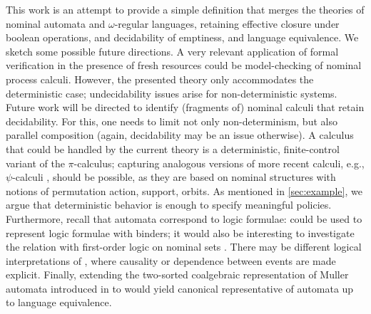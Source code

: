 This work is an attempt to provide a simple definition that merges the theories of nominal automata and $\omega$-regular languages, retaining effective closure under boolean operations, and decidability of emptiness, and language equivalence. We sketch some possible future directions. A very relevant application of formal verification in the presence of fresh resources could be model-checking of nominal process calculi. However, the presented theory only accommodates the deterministic case; undecidability issues arise for non-deterministic systems. Future work will be directed to identify (fragments of) nominal calculi that retain decidability. For this, one needs to limit not only non-determinism, but also parallel composition (again, decidability may be an issue otherwise). A calculus that could be handled by the current theory is a deterministic, finite-control variant of the $\pi$-calculus; capturing analogous versions of more recent calculi, e.g., $\psi$-calculi \cite{Bengtson11}, should be possible, as they are based on nominal structures with notions of permutation action, support, orbits. As mentioned in \autoref{sec:example}, we argue that deterministic behavior is enough to specify meaningful policies. 
%
Furthermore, recall that automata correspond to logic formulae: \hdmas{} could be used to represent logic formulae with binders; it would also be interesting to investigate the relation with first-order logic on nominal sets \cite{Bojanczyk13}. There may be different logical interpretations of \hdmas, where causality or dependence \cite{Vnnen07,Galliani12} between events are made explicit. Finally, extending the two-sorted coalgebraic representation of Muller automata introduced in \cite{CV12} to \hdmas{} would yield canonical representative of automata up to language equivalence.
